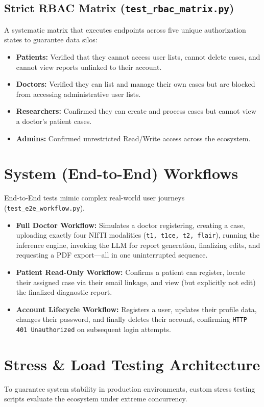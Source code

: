 \documentclass[11pt, a4paper]{article}
\begin{document}
\subsection{Strict RBAC Matrix (\texttt{test\_rbac\_matrix.py})}
A systematic matrix that executes endpoints across five unique authorization states to guarantee data silos:
\begin{itemize}
    \item \textbf{Patients:} Verified that they cannot access user lists, cannot delete cases, and cannot view reports unlinked to their account.
    \item \textbf{Doctors:} Verified they can list and manage their own cases but are blocked from accessing administrative user lists.
    \item \textbf{Researchers:} Confirmed they can create and process cases but cannot view a doctor's patient cases.
    \item \textbf{Admins:} Confirmed unrestricted Read/Write access across the ecosystem.
\end{itemize}

\section{System (End-to-End) Workflows}
End-to-End tests mimic complex real-world user journeys (\texttt{test\_e2e\_workflow.py}).

\begin{itemize}
    \item \textbf{Full Doctor Workflow:} Simulates a doctor registering, creating a case, uploading exactly four NIfTI modalities (\texttt{t1, t1ce, t2, flair}), running the inference engine, invoking the LLM for report generation, finalizing edits, and requesting a PDF export—all in one uninterrupted sequence.
    \item \textbf{Patient Read-Only Workflow:} Confirms a patient can register, locate their assigned case via their email linkage, and view (but explicitly not edit) the finalized diagnostic report.
    \item \textbf{Account Lifecycle Workflow:} Registers a user, updates their profile data, changes their password, and finally deletes their account, confirming \texttt{HTTP 401 Unauthorized} on subsequent login attempts.
\end{itemize}

\section{Stress \& Load Testing Architecture}
To guarantee system stability in production environments, custom stress testing scripts evaluate the ecosystem under extreme concurrency.
\end{document}
